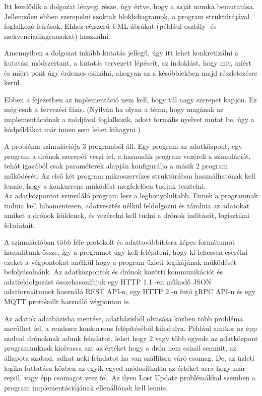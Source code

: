 
Itt kezdődik a dolgozat lényegi része, úgy értve, hogy a saját munka bemutatása.
Jellemzően ebben szerepelni szoktak blokkdiagramok, a program struktúrájával foglalkozó leírások.
Ehhez célszerű UML ábrákat (például osztály- és szekvenciadiagramokat) használni.

Amennyiben a dolgozat inkább kutatás jellegű, úgy itt lehet konkretizálni a kutatási módszertant, a kutatás tervezett lépéseit, az indoklást, hogy mit, miért és miért pont úgy érdemes csinálni, ahogyan az a későbbiekben majd részletezésre kerül.

Ebben a fejezetben az implementáció nem kell, hogy túl nagy szerepet kapjon.
Ez még csak a tervezési fázis.
(Nyilván ha olyan a téma, hogy magának az implementációnak a módjával foglalkozik, adott formális nyelvet mutat be, úgy a kódpéldákat már innen sem lehet kihagyni.)

A probléma szimulációja 3 programból áll. Egy program az adatközpont, egy program a drónok szerepét veszi fel, a harmadik program vezéreli a szimulációt,
tehát igazából csak paraméterek alapján konfigurálja a másik 2 program működését. Az első két program mikroszervízes struktúrában használhatónak kell lennie, hogy a konkurrens működést megfelelően tudjuk tesztelni.\\
Az adatközpontot szimuláló program lesz a legbonyolultabb. Ennek a programnak tudnia kell hibamentesen, adatvesztés nélkül
feldolgozni és tárolnia az adatokat amiket a drónok küldenek, és vezérelni kell tudni a drónok indítását, logisztikai feladatait.

A szimulációban több féle protokolt és adattovábbításra képes formátumot hasonlítunk össze, így a programot úgy kell felépíteni,
hogy ki lehessen cserélni ezeket a végpontokat anélkül hogy a program üzleti logikájának működését befolyásolnánk. Az adatközpontok és drónok közötti kommunikációt és adatfeldolgozást összehasonlítjuk
egy HTTP 1.1 -en műkodő JSON adatformátumot használó REST API-n, egy HTTP 2 -n futó gRPC API-n és egy MQTT protokollt használó végponton is.

Az adatok adatbázisba mentése, adatbázisból olvasása közben több probléma merülhet fel, a rendszer konkurrens felépítéséből kiindulva.
Például amikor az épp szabad drónoknak adunk feladatot, lehet hogy 2 vagy több egyede az adatközpont programunknak kiolvassa azt az értéket hogy
a drón nem csinál semmit, az állapota szabad, adhat neki feladatot ha van szállítsra váró csomag. De, az üzleti logika futtatása közben az egyik egyed módosíthatta
az értéket arra hogy már repül, vagy épp csomagot vesz fel. Az ilyen Lost Update problémákkal szemben a program implementációjának ellenállónak kell lennie.

